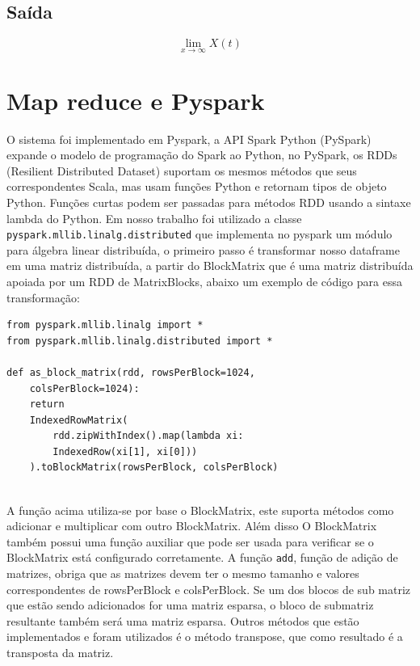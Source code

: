 \documentclass[conference]{IEEEtran}
\begin{document}
\subsection{Saída}
\begin{equation}
    \lim\limits_{x \to \infty} X(t)
\end{equation}


\section{Map reduce e Pyspark}

O sistema foi implementado em Pyspark, a API Spark Python (PySpark) expande o modelo de programação do Spark ao Python, no PySpark, os RDDs (Resilient Distributed Dataset)\cite{b10} suportam os mesmos métodos que seus correspondentes Scala, mas usam funções Python e retornam tipos de objeto Python. Funções curtas podem ser passadas para métodos RDD usando a sintaxe lambda do Python. Em nosso trabalho  foi utilizado a classe \texttt{pyspark.mllib.linalg.distributed} que implementa no pyspark um módulo para álgebra linear distribuída, o primeiro passo é transformar nosso dataframe em uma matriz distribuída, a partir do BlockMatrix que é uma matriz distribuída apoiada por um RDD de MatrixBlocks, abaixo um exemplo de código para essa transformação:

\lstset{language=Python}
\lstset{frame=lines}
\lstset{basicstyle=\footnotesize}
\begin{lstlisting}
from pyspark.mllib.linalg import *
from pyspark.mllib.linalg.distributed import *

def as_block_matrix(rdd, rowsPerBlock=1024,
    colsPerBlock=1024):
    return 
    IndexedRowMatrix(
        rdd.zipWithIndex().map(lambda xi:
        IndexedRow(xi[1], xi[0]))
    ).toBlockMatrix(rowsPerBlock, colsPerBlock)
  
\end{lstlisting}

A função acima utiliza-se por base o BlockMatrix, este suporta métodos como adicionar e multiplicar com outro BlockMatrix. Além disso O BlockMatrix também possui uma função auxiliar que pode ser usada para verificar se o BlockMatrix está configurado corretamente. A função \texttt{add}, função de adição de matrizes, obriga que as matrizes devem ter o mesmo tamanho e valores correspondentes de rowsPerBlock e colsPerBlock. Se um dos blocos de sub matriz que estão sendo adicionados for uma matriz esparsa, o bloco de submatriz resultante também será uma matriz esparsa. Outros métodos que estão implementados e foram utilizados é o método transpose, que como resultado é a transposta da matriz.
\end{document}
